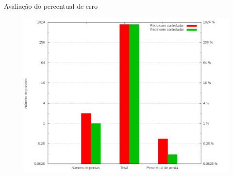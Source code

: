 \begin{frame}{Avaliação do percentual de erro}

    \begin{figure}[!htb]
        \centering
        \includegraphics[scale=.35]{images/error-stats}
    \end{figure}
\end{frame}


